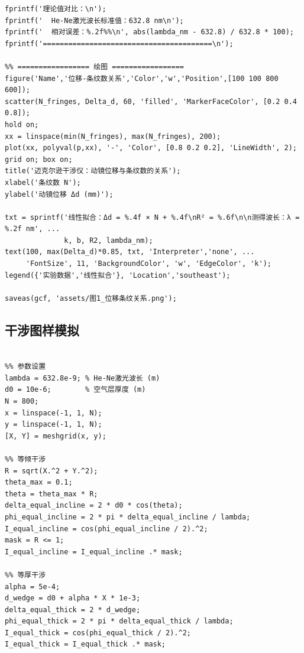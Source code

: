 ﻿\documentclass[12pt,a4paper]{article}
\begin{document}
\begin{lstlisting}[style=Matlab-boxed,caption={迈克尔逊干涉仪数据处理代码}]
fprintf('理论值对比：\n');
fprintf('  He-Ne激光波长标准值：632.8 nm\n');
fprintf('  相对误差：%.2f%%\n', abs(lambda_nm - 632.8) / 632.8 * 100);
fprintf('========================================\n');

%% ================= 绘图 =================
figure('Name','位移-条纹数关系','Color','w','Position',[100 100 800 600]);
scatter(N_fringes, Delta_d, 60, 'filled', 'MarkerFaceColor', [0.2 0.4 0.8]);
hold on;
xx = linspace(min(N_fringes), max(N_fringes), 200);
plot(xx, polyval(p,xx), '-', 'Color', [0.8 0.2 0.2], 'LineWidth', 2);
grid on; box on;
title('迈克尔逊干涉仪：动镜位移与条纹数的关系');
xlabel('条纹数 N');
ylabel('动镜位移 Δd (mm)');

txt = sprintf('线性拟合：Δd = %.4f × N + %.4f\nR² = %.6f\n\n测得波长：λ = %.2f nm', ...
              k, b, R2, lambda_nm);
text(100, max(Delta_d)*0.85, txt, 'Interpreter','none', ...
     'FontSize', 11, 'BackgroundColor', 'w', 'EdgeColor', 'k');
legend({'实验数据','线性拟合'}, 'Location','southeast');

saveas(gcf, 'assets/图1_位移条纹关系.png');
\end{lstlisting}

\subsection{干涉图样模拟}

\begin{lstlisting}[style=Matlab-boxed,caption={干涉图样模拟代码（节选）}]
%% 迈克尔逊干涉仪 —— 干涉图样模拟

%% 参数设置
lambda = 632.8e-9; % He-Ne激光波长 (m)
d0 = 10e-6;        % 空气层厚度 (m)
N = 800;
x = linspace(-1, 1, N);
y = linspace(-1, 1, N);
[X, Y] = meshgrid(x, y);

%% 等倾干涉
R = sqrt(X.^2 + Y.^2);
theta_max = 0.1;
theta = theta_max * R;
delta_equal_incline = 2 * d0 * cos(theta);
phi_equal_incline = 2 * pi * delta_equal_incline / lambda;
I_equal_incline = cos(phi_equal_incline / 2).^2;
mask = R <= 1;
I_equal_incline = I_equal_incline .* mask;

%% 等厚干涉
alpha = 5e-4;
d_wedge = d0 + alpha * X * 1e-3;
delta_equal_thick = 2 * d_wedge;
phi_equal_thick = 2 * pi * delta_equal_thick / lambda;
I_equal_thick = cos(phi_equal_thick / 2).^2;
I_equal_thick = I_equal_thick .* mask;
\end{lstlisting}
\end{document}

